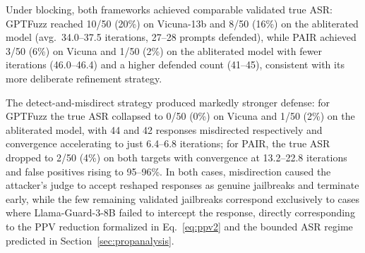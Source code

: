 \documentclass[conference,compsoc]{IEEEtran}
\begin{document}
\begin{table}[t]
    \centering
    \setlength{\tabcolsep}{6pt}
    \renewcommand{\arraystretch}{1.2}
    \caption{PAIR end-to-end results (50 prompts, max 50 iterations, rigorously validated ASR).}
    \label{tab:pair_e2e}
\end{table}

Under blocking, both frameworks achieved comparable validated true ASR: GPTFuzz reached 10/50 (20\%) on Vicuna-13b and 8/50 (16\%) on the abliterated model (avg.\ 34.0--37.5 iterations, 27--28 prompts defended), while PAIR achieved 3/50 (6\%) on Vicuna and 1/50 (2\%) on the abliterated model with fewer iterations (46.0--46.4) and a higher defended count (41--45), consistent with its more deliberate refinement strategy.

The detect-and-misdirect strategy produced markedly stronger defense: for GPTFuzz the true ASR collapsed to 0/50 (0\%) on Vicuna and 1/50 (2\%) on the abliterated model, with 44 and 42 responses misdirected respectively and convergence accelerating to just 6.4--6.8 iterations; for PAIR, the true ASR dropped to 2/50 (4\%) on both targets with convergence at 13.2--22.8 iterations and false positives rising to 95--96\%. In both cases, misdirection caused the attacker's judge to accept reshaped responses as genuine jailbreaks and terminate early, while the few remaining validated jailbreaks correspond exclusively to cases where Llama-Guard-3-8B failed to intercept the response, directly corresponding to the PPV reduction formalized in Eq.~\eqref{eq:ppv2} and the bounded ASR regime predicted in Section~\ref{sec:propanalysis}.
\end{document}
